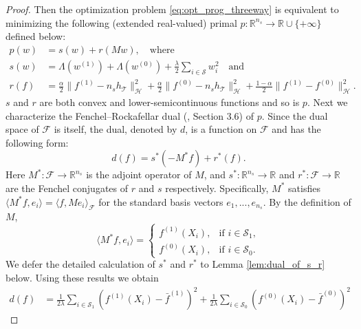 \documentclass[12pt]{article}
\begin{document}
\begin{proof}
	Then the optimization problem \eqref{eq:opt_prog_threeway} is equivalent to minimizing the following (extended real-valued) primal $p: \mathbb{R}^{n_s} \rightarrow \mathbb{R} \cup \{+\infty\}$ defined below:
	\begin{equation}
		\label{eq:primal_def}
		\begin{aligned}
			p(w) &= s(w) + r(M w), \quad \text{where} \\
			s(w) &= \Lambda(w^{(1)}) + \Lambda(w^{(0)}) + \frac{\lambda}{2} \sum_{i \in \mathcal{S}} w_i^2 \quad \text{and} \\
			r(f) &= \frac{\alpha}{2} \| f^{(1)} - n_s h_\mathcal{T} \|_\mathcal{H}^2 + 
			\frac{\alpha}{2} \| f^{(0)} - n_s h_\mathcal{T} \|_\mathcal{H}^2 +
			\frac{1-\alpha}{2} \| f^{(1)} - f^{(0)} \|_\mathcal{H}^2
			.\end{aligned}
	\end{equation}
	$s$ and $r$ are both convex and lower-semicontinuous functions and so is $p$. Next we characterize the Fenchel–Rockafellar dual (\citet{peypouquet2015convex}, Section 3.6) of $p$. Since the dual space of $\mathcal{F}$ is itself, the dual, denoted by $d$, is a function on $\mathcal{F}$ and has the following form:
	\begin{equation}
		\label{eq:dual_def}
		d(f) = s^*(- M^* f) + r^*(f)
		.\end{equation}
	Here $M^*: \mathcal{F} \rightarrow \mathbb{R}^{n_s}$ is the adjoint operator of $M$, and $s^*: \mathbb{R}^{n_s} \rightarrow \mathbb{R}$ and $r^*: \mathcal{F} \rightarrow \mathbb{R}$ are the Fenchel conjugates of $r$ and $s$ respectively. Specifically, $M^*$ satisfies $\langle M^* f, e_i \rangle = \langle f, M e_i \rangle_{\mathcal{F}}$
	for the standard basis vectors $e_1, ..., e_{n_s}$. By the definition of $M$,
	\begin{equation}
		\label{eq:M_star_f}
		\langle M^* f, e_i \rangle = 
		\begin{cases}
			f^{(1)}(X_i), & \text{if } i \in \mathcal{S}_1, \\
			f^{(0)}(X_i), & \text{if } i \in \mathcal{S}_0.
		\end{cases}
	\end{equation}
	We defer the detailed calculation of $s^*$ and $r^*$ to Lemma \ref{lem:dual_of_s_r} below. Using these results we obtain
	\begin{equation}
		\label{eq:dual}
		\begin{aligned}
			d(f) 
			&= 
			\frac{1}{2\lambda} \sum_{i \in \mathcal{S}_1} (f^{(1)}(X_i) - \bar{f}^{(1)})^2 +
			\frac{1}{2\lambda} \sum_{i \in \mathcal{S}_0} (f^{(0)}(X_i) - \bar{f}^{(0)})^2 

\end{aligned}
\end{equation}
\end{proof}
\end{document}
